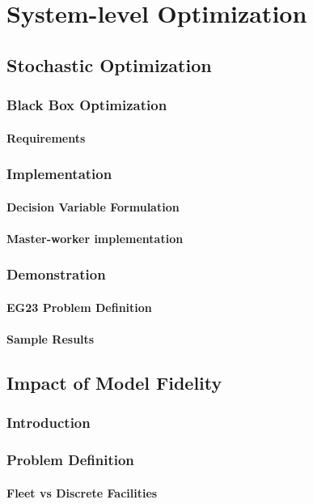 \section{System-level Optimization}\label{section:system}
\subsection{Stochastic Optimization}
\subsubsection{Black Box Optimization}
\paragraph{Requirements}

\subsubsection{Implementation}
\paragraph{Decision Variable Formulation}
\paragraph{Master-worker implementation}
\subsubsection{Demonstration}
\paragraph{EG23 Problem Definition}
\paragraph{Sample Results}
\subsection{Impact of Model Fidelity}
\subsubsection{Introduction}
\subsubsection{Problem Definition}
\paragraph{Fleet vs Discrete Facilities}
